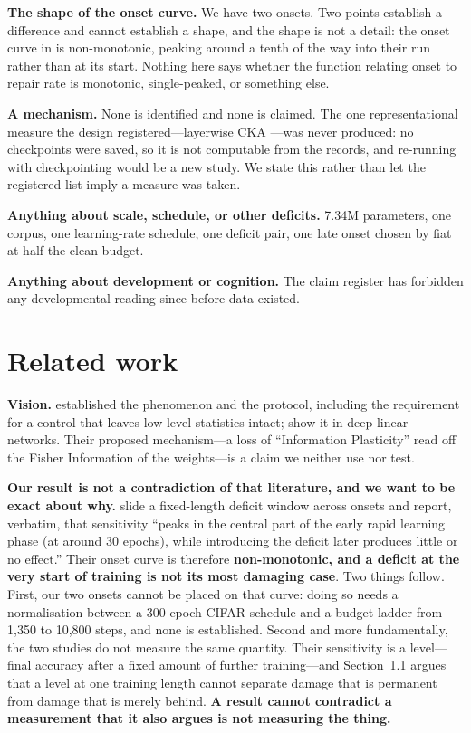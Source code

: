 \documentclass[11pt]{article}
\begin{document}
\textbf{The shape of the onset curve.} We have two onsets. Two points establish a
difference and cannot establish a shape, and the shape is not a detail: the onset
curve in \citet{achille2019critical} is non-monotonic, peaking around a tenth of
the way into their run rather than at its start. Nothing here says whether the
function relating onset to repair rate is monotonic, single-peaked, or something
else.

\textbf{A mechanism.} None is identified and none is claimed. The one
representational measure the design registered---layerwise CKA
\citep{kornblith2019similarity}---was never produced: no checkpoints were saved,
so it is not computable from the records, and re-running with checkpointing would
be a new study. We state this rather than let the registered list imply a measure
was taken.

\textbf{Anything about scale, schedule, or other deficits.} 7.34M parameters, one
corpus, one learning-rate schedule, one deficit pair, one late onset chosen by
fiat at half the clean budget.

\textbf{Anything about development or cognition.} The claim register has forbidden
any developmental reading since before data existed.

\section{Related work}
\label{sec:related}

\textbf{Vision.} \citet{achille2019critical} established the phenomenon and the
protocol, including the requirement for a control that leaves low-level
statistics intact; \citet{kleinman2024critical} show it in deep linear networks.
Their proposed mechanism---a loss of ``Information Plasticity'' read off the
Fisher Information of the weights---is a claim we neither use nor test.

\textbf{Our result is not a contradiction of that literature, and we want to be
exact about why.} \citet{achille2019critical} slide a fixed-length deficit window
across onsets and report, verbatim, that sensitivity ``peaks in the central part
of the early rapid learning phase (at around 30 epochs), while introducing the
deficit later produces little or no effect.'' Their onset curve is therefore
\textbf{non-monotonic, and a deficit at the very start of training is not its most
damaging case}. Two things follow. First, our two onsets cannot be placed on that
curve: doing so needs a normalisation between a 300-epoch CIFAR schedule and a
budget ladder from 1{,}350 to 10{,}800 steps, and none is established. Second and
more fundamentally, the two studies do not measure the same quantity. Their
sensitivity is a level---final accuracy after a fixed amount of further
training---and Section~1.1 argues that a level at one training length cannot
separate damage that is permanent from damage that is merely behind. \textbf{A
result cannot contradict a measurement that it also argues is not measuring the
thing.}
\end{document}
